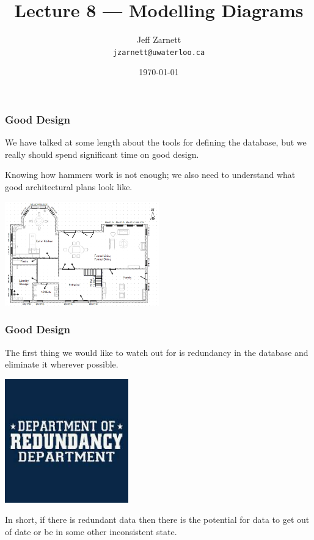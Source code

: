 

\title{Lecture 8 --- Modelling Diagrams}

\author{Jeff Zarnett \\ \small \texttt{jzarnett@uwaterloo.ca}}
\date{\today}




\begin{frame}
  \titlepage

 \end{frame}


\begin{frame}
\frametitle{Good Design}

We have talked at some length about the tools for defining the database, but we really should spend significant time on good design. 

Knowing how hammers work is not enough; we also need to understand what good architectural plans look like.

\begin{center}
	\includegraphics[width=0.5\textwidth]{images/floorplan.jpg}
\end{center}

 \end{frame}


\begin{frame}
\frametitle{Good Design}

The first thing we would like to watch out for is redundancy in the database and eliminate it wherever possible. 

\begin{center}
	\includegraphics[width=0.4\textwidth]{images/dept.jpg}
\end{center}

In short, if there is redundant data then there is the potential for data to get out of date or be in some other inconsistent state. 

\end{frame}



